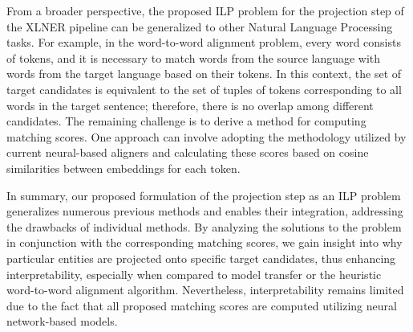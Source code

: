 From a broader perspective, the proposed ILP problem for the projection step of the XLNER pipeline
can be generalized to other Natural Language Processing tasks. For example, in the word-to-word
alignment problem, every word consists of tokens, and it is necessary to match words from the source
language with words from the target language based on their tokens. In this context, the set of target
candidates is equivalent to the set of tuples of tokens corresponding to all words in the target
sentence; therefore, there is no overlap among different candidates. The remaining challenge
is to derive a method for computing matching scores. One approach can involve adopting the methodology
utilized by current neural-based aligners and calculating these scores based on cosine similarities
between embeddings for each token.

In summary, our proposed formulation of the projection step as an ILP problem generalizes numerous
previous methods and enables their integration, addressing the drawbacks of individual methods.
By analyzing the solutions to the problem in conjunction with the corresponding matching scores,
we gain insight into why particular entities are projected onto specific target candidates, thus
enhancing interpretability, especially when compared to model transfer or the heuristic word-to-word
alignment algorithm. Nevertheless, interpretability remains limited due to the fact that all
proposed matching scores are computed utilizing neural network-based models.
